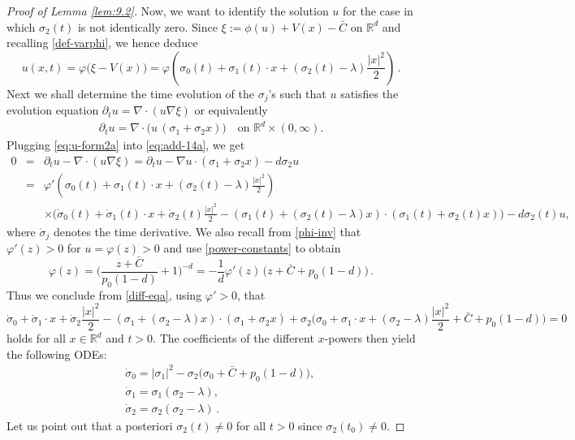 \documentclass[reqno]{amsart}
\newcommand{\R}{\mathbb{R}}
\begin{document}
\begin{proof}[Proof of Lemma \ref{lem:9.2}]
Now, we want to identify the solution $u$ for the case in which $\sigma_2(t)$ is not identically zero. Since $\xi:=\phi(u)+V(x)-\bar C$ on $\R^d$ and recalling \eqref{def-varphi}, we hence deduce
\begin{equation}\label{eq:u-form2a}
  u(x,t)=\varphi\big(\xi-V(x)\big)
  =\varphi\left(\sigma_0(t)+\sigma_1(t)\cdot x+(\sigma_2(t)-\lambda)\frac{|x|^2}{2}\right)\,.
\end{equation}
Next we shall determine the time evolution of the $\sigma_j$'s such that $u$ satisfies the evolution equation $\partial_tu=\nabla\cdot(u\nabla\xi)$ or equivalently
  \begin{align}
    \label{eq:add-14a}
    \partial_tu = \nabla\cdot\big(u\,(\sigma_1+\sigma_2x)\big)      \quad \mbox{on }\R^d\times (0,\infty).
  \end{align}
Plugging \eqref{eq:u-form2a} into \eqref{eq:add-14a}, we get
\begin{eqnarray}\label{diff-eqa}
 0&=& \partial_t u-\nabla\cdot(u\nabla\xi) = \partial_t u-\nabla u\cdot(\sigma_1+\sigma_2 x)-d\sigma_2 u \nonumber\\
 &=& \varphi'\left(\sigma_0(t)+\sigma_1(t)\cdot x+(\sigma_2(t)-\lambda)\frac{|x|^2}{2}\right) \\
 &&\times \Big(\dot\sigma_0(t)+\dot\sigma_1(t)\cdot x+ \dot\sigma_2(t)\frac{|x|^2}{2}
 -(\sigma_1(t)+(\sigma_2(t)-\lambda) x)\cdot(\sigma_1(t)+\sigma_2(t) x)\Big)-d\sigma_2(t) u, \nonumber
\end{eqnarray}
where $\dot\sigma_j$ denotes the time derivative. We also recall from \eqref{phi-inv} that $\varphi'(z)>0$ for $u=\varphi(z)>0$ and use \eqref{power-constants} to obtain
$$
  \varphi(z)=\Big(\frac{z+\bar C}{p_0(1-d)}+1\Big)^{-d}
  =-\frac{1}{d} \varphi'(z) \,\big(z+\bar C+p_0(1-d)\big)\,.
$$
Thus we conclude from \eqref{diff-eqa}, using $\varphi'>0$, that
\begin{equation*} %
    \dot \sigma_0+\dot\sigma_1\cdot x+\dot\sigma_2\frac{|x|^2}{2}-(\sigma_1+(\sigma_2-\lambda) x)\cdot(\sigma_1+\sigma_2 x)
    +\sigma_2\Big(\sigma_0+\sigma_1\cdot x+(\sigma_2-\lambda)\frac{|x|^2}{2} +\bar C+p_0(1-d)\Big) =0\,
\end{equation*}
holds for all $x\in\R^d$ and $t> 0$.
The coefficients of the different $x$-powers then yield the following ODEs:
\begin{eqnarray*}
    && \dot\sigma_0 =|\sigma_1|^2
    -\sigma_2\big(\sigma_0
    +\bar C+p_0(1-d)\big), \\
    && \dot\sigma_1=\sigma_1(\sigma_2-\lambda), \\
    && \dot\sigma_2=\sigma_2(\sigma_2-\lambda)\,.
\end{eqnarray*}
Let us point out that a posteriori $\sigma_2(t)\neq 0$ for all $t>0$ since $\sigma_2(t_0)\neq 0$.


\end{proof}
\end{document}
